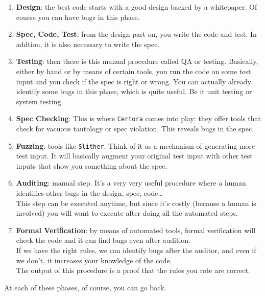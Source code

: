 \documentclass[oneside]{book}
\begin{document}
    \begin{enumerate}
        \item\textbf{Design}: the best code starts with a good design backed by a whitepaper.
            Of course you can have bugs in this phase.
        \item\textbf{Spec, Code, Test}: from the design part on, you write the code and test.
            In addtion, it is also necessary to write the spec.
        \item\textbf{Testing}: then there is this manual procedure called QA or testing.
            Basically, either by hand or by means of certain tools, you run the code on some test input and you check if the spec is right or wrong.
            You can actually already identify some bugs in this phase, which is quite useful.
            Be it unit testing or system testing.\\

        \item\textbf{Spec Checking}: This is where \texttt{Certora} comes into play: they offer tools that check for vacuous tautology or spec violation.
            This reveals bugs in the spec.
        \item\textbf{Fuzzing}: tools like \texttt{Slither}.
            Think of it as a mechanism of generating more test input.
            It will basically augment your original test input with other test inputs that show you something about the spec.
        \item\textbf{Auditing}: manual step.
            It's a very very useful procedure where a human identifies other bugs in the design, spec, code\dots\\
            This step can be executed anytime, but since it's costly (because a human is involved) you will want to execute after doing all the automated steps.
        \item\textbf{Formal Verification}: by means of automated tools, formal verification will check the code and it can find bugs even after audition.\\

        If we have the right rules, we can identify bugs after the auditor, and even if we don't, it increases your knowledge of the code.\\

        The output of this procedure is a proof that the rules you rote are correct.
    \end{enumerate}

    At each of these phases, of course, you can go back.
\end{document}
